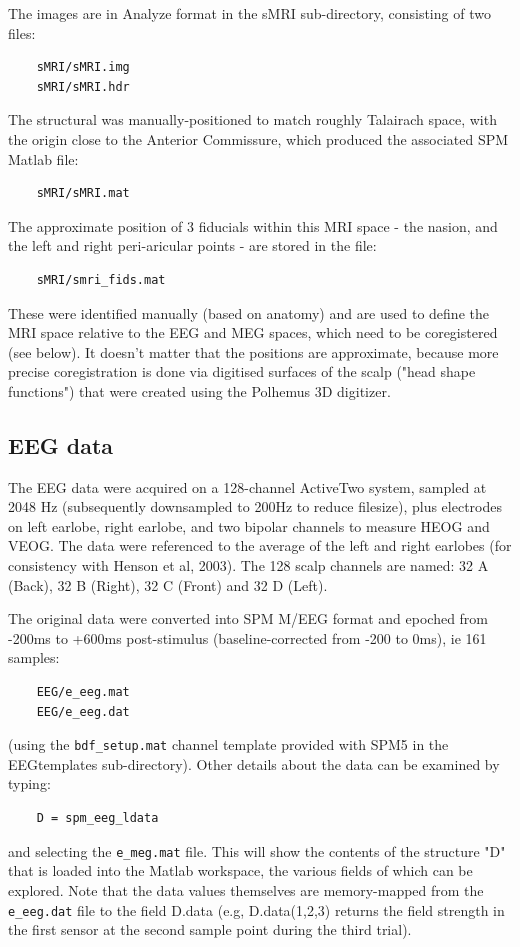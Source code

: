 The images are in Analyze format in the sMRI sub-directory, consisting of two files:
\begin{verbatim}
	sMRI/sMRI.img
	sMRI/sMRI.hdr
\end{verbatim}
The structural was manually-positioned to match roughly Talairach space, with the origin close to the Anterior Commissure, which produced the associated SPM Matlab file:
\begin{verbatim}
	sMRI/sMRI.mat
\end{verbatim}
The approximate position of 3 fiducials within this MRI space - the nasion, and the left and right peri-aricular points - are stored in the file:
\begin{verbatim}
	sMRI/smri_fids.mat
\end{verbatim}
These were identified manually (based on anatomy) and are used to define the MRI space relative to the EEG and MEG spaces, which need to be coregistered (see below). It doesn't matter that the positions are approximate, because more precise coregistration is done via digitised surfaces of the scalp ("head shape functions") that were created using the Polhemus 3D digitizer.

\subsection{EEG data}

The EEG data were acquired on a 128-channel ActiveTwo system, sampled at 2048 Hz (subsequently downsampled to 200Hz to reduce filesize), plus electrodes on left earlobe, right earlobe, and two bipolar channels to measure HEOG and VEOG. The data were referenced to the average of the left and right earlobes (for consistency with Henson et al, 2003). The 128 scalp channels are named: 32 A (Back), 32 B (Right), 32 C (Front) and 32 D (Left).

The original data were converted into SPM M/EEG format and epoched from -200ms to +600ms post-stimulus (baseline-corrected from -200 to 0ms), ie 161 samples:
\begin{verbatim}
	EEG/e_eeg.mat
	EEG/e_eeg.dat
\end{verbatim}
(using the \verb!bdf_setup.mat! channel template provided with SPM5 in the EEGtemplates sub-directory).
Other details about the data can be examined by typing:
\begin{verbatim}
	D = spm_eeg_ldata
\end{verbatim}
and selecting the \verb!e_meg.mat! file. This will show the contents of the structure "D" that is loaded into the Matlab workspace, the various fields of which can be explored. Note that the data values themselves are memory-mapped from the \verb!e_eeg.dat! file to the field D.data (e.g, D.data(1,2,3) returns the field strength in the first sensor at the second sample point during the third trial).

